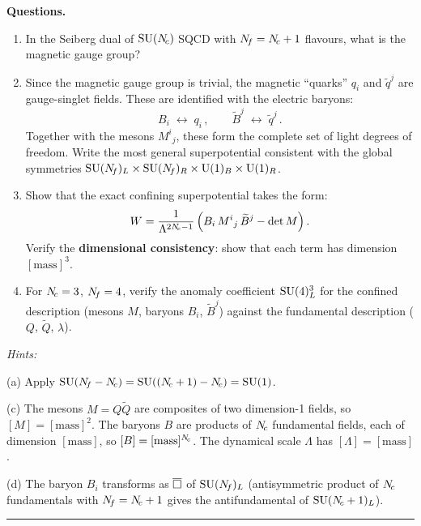 \documentclass[11pt,a4paper]{article}
\begin{document}
\noindent\textbf{Questions.}
\begin{enumerate}[label=(\alph*)]
  \item In the Seiberg dual of $\mathrm{SU}(N_{\!c})$ SQCD with $N_{\!f} = N_{\!c} + 1$
    flavours, what is the magnetic gauge group?

  \item Since the magnetic gauge group is trivial, the magnetic ``quarks''
    $q_i$ and $\widetilde{q}^j$ are gauge-singlet fields.  These are
    identified with the electric baryons:
    \[
      B_i \;\longleftrightarrow\; q_i\,,
      \qquad
      \widetilde{B}^j \;\longleftrightarrow\; \widetilde{q}^j\,.
    \]
    Together with the mesons $M^i{}_j$, these form the complete
    set of light degrees of freedom.  Write the most general
    superpotential consistent with the global symmetries
    $\mathrm{SU}(N_{\!f})_L \times \mathrm{SU}(N_{\!f})_R \times \mathrm{U}(1)_B \times \mathrm{U}(1)_R$.

  \item Show that the exact confining superpotential takes the form:
    \begin{equation}\label{eq:W-sconf}
      W = \frac{1}{\Lambda^{2N_{\!c} - 1}}
      \left(B_i\, M^i{}_j\, \widetilde{B}^j - \det M\right).
    \end{equation}
    Verify the \textbf{dimensional consistency}: show that each term
    has dimension $[\mathrm{mass}]^3$.

  \item For $N_{\!c} = 3$, $N_{\!f} = 4$, verify the anomaly coefficient
    $\mathrm{SU}(4)_L^3$ for the confined description (mesons $M$, baryons
    $B_i$, $\widetilde{B}^j$) against the fundamental description
    ($Q$, $\widetilde{Q}$, $\lambda$).
\end{enumerate}

\medskip

\noindent\textit{Hints:}

(a) Apply $\mathrm{SU}(N_{\!f} - N_{\!c}) = \mathrm{SU}((N_{\!c}+1) - N_{\!c}) = \mathrm{SU}(1)$.

(c) The mesons $M = Q\widetilde{Q}$ are composites of two dimension-1
fields, so $[M] = [\mathrm{mass}]^2$.
The baryons $B$ are products of $N_{\!c}$ fundamental fields, each of
dimension $[\mathrm{mass}]$, so $[B] = [\mathrm{mass}]^{N_{\!c}}$.
The dynamical scale $\Lambda$ has $[\Lambda] = [\mathrm{mass}]$.

(d) The baryon $B_i$ transforms as $\overline{\square}$ of $\mathrm{SU}(N_{\!f})_L$
(antisymmetric product of $N_{\!c}$ fundamentals with $N_{\!f} = N_{\!c} + 1$
gives the antifundamental of $\mathrm{SU}(N_{\!c}+1)_L$).

\bigskip
\hrule
\bigskip
\end{document}
